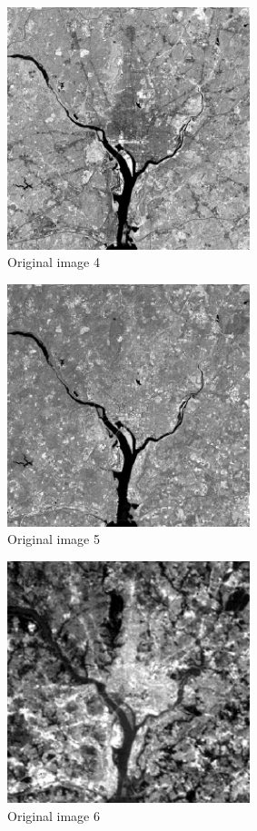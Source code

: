 \documentclass[10pt]{article}
\begin{document}
\begin{figure}[!ht]
	\centering
	\includegraphics[height=200pt]{./ex10/WashingtonDC_Band4.jpg}
	\caption{Original image 4}
\end{figure}
\begin{figure}[!ht]
	\centering
	\includegraphics[height=200pt]{./ex10/WashingtonDC_Band5.jpg}
	\caption{Original image 5}
\end{figure}
\begin{figure}[!ht]
	\centering
	\includegraphics[height=200pt]{./ex10/WashingtonDC_Band6.jpg}
	\caption{Original image 6}
\end{figure}
\end{document}

